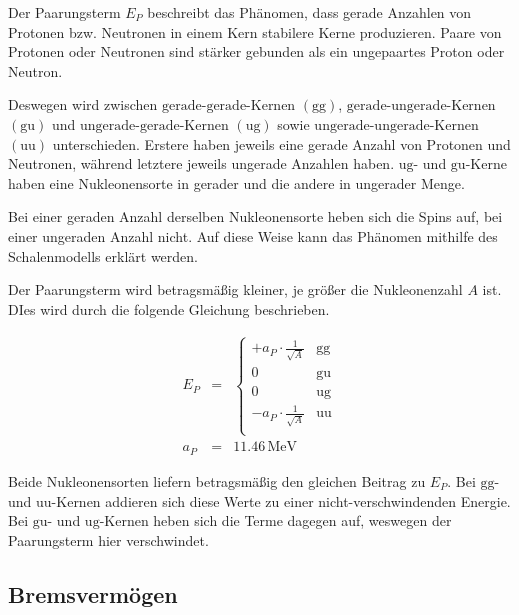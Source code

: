 \documentclass[12pt,a4paper]{scrartcl}
\numberwithin{equation}{section} %
\renewcommand{\[}{} %
\renewcommand{\]}{\noindent} %
\begin{document}
Der Paarungsterm \(E_P\) beschreibt das Phänomen, dass gerade Anzahlen
von Protonen bzw. Neutronen in einem Kern stabilere Kerne produzieren.
Paare von Protonen oder Neutronen sind stärker gebunden als ein
ungepaartes Proton oder Neutron.

Deswegen wird zwischen \(\mathrm{gerade}\)-\(\mathrm{gerade}\)-Kernen
\((\mathrm{gg})\), \(\mathrm{gerade}\)-\(\mathrm{ungerade}\)-Kernen
\((\mathrm{gu})\) und \(\mathrm{ungerade}\)-\(\mathrm{gerade}\)-Kernen
\((\mathrm{ug})\) sowie
\(\mathrm{ungerade}\)-\(\mathrm{ungerade}\)-Kernen \((\mathrm{uu})\)
unterschieden. Erstere haben jeweils eine gerade Anzahl von Protonen und
Neutronen, während letztere jeweils ungerade Anzahlen haben.
\(\mathrm{ug}\)- und \(\mathrm{gu}\)-Kerne haben eine Nukleonensorte in
gerader und die andere in ungerader Menge.

Bei einer geraden Anzahl derselben Nukleonensorte heben sich die Spins
auf, bei einer ungeraden Anzahl nicht. Auf diese Weise kann das Phänomen
mithilfe des Schalenmodells erklärt werden.

Der Paarungsterm wird betragsmäßig kleiner, je größer die Nukleonenzahl
\(A\) ist. DIes wird durch die folgende Gleichung beschrieben.

\[
\begin{eqnarray}
    E_P &=&
        \begin{cases}
            + a_P\cdot \frac{1}{\sqrt{A}} & \text{gg} \\
            0 & \text{gu} \\
            0 & \text{ug} \\
            - a_P\cdot \frac{1}{\sqrt{A}} & \text{uu} \\
        \end{cases}
        \label{Paarungsterm} \\
    a_P &=& 11.46\mathrm{\,MeV}
\end{eqnarray}
\]

Beide Nukleonensorten liefern betragsmäßig den gleichen Beitrag zu
\(E_P\). Bei \(\mathrm{gg}\)- und \(\mathrm{uu}\)-Kernen addieren sich
diese Werte zu einer nicht-verschwindenden Energie. Bei \(\mathrm{gu}\)-
und \(\mathrm{ug}\)-Kernen heben sich die Terme dagegen auf, weswegen
der Paarungsterm hier verschwindet.

\hypertarget{bremsvermuxf6gen}{%
\subsection{Bremsvermögen}\label{bremsvermuxf6gen}}
\end{document}
